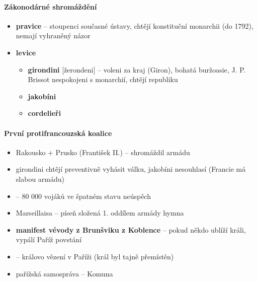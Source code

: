 \paragraph{Zákonodárné shromáždění}
\begin{itemize}
\item \textbf{pravice} -- stoupenci současné ústavy, chtějí konstituční monarchii (do 1792), nemají vyhraněný názor
\item \textbf{levice}
	\begin{itemize}
	\item \textbf{girondini} [žerondeni] -- voleni za kraj (Giron), bohatá buržoasie, J. P. Brissot \ra nespokojeni s monarchií, chtějí republiku
	\item \textbf{jakobíni}
	\item \textbf{cordelieři}
	\end{itemize}
\end{itemize}

\paragraph{První protifrancouzská koalice}
\begin{itemize}
\item Rakousko + Prusko (František II.) -- shromáždil armádu
\item girondini chtějí preventivně vyhásit válku, jakobíni nesouhlasí (Francie má slabou armádu)
\item {} -- 80 000 vojáků ve špatném
 stavu \ra neúspěch
\item Marseillaisa -- píseň složená 1. oddílem armády \ra hymna
\item \textbf{manifest vévody z Brunšviku z Koblence} -- pokud někdo ublíží králi, vypálí Paříž \ra povstání
\item {} -- královo vězení v Paříži (král byl tajně přemístěn)
\item pařížská samospráva -- Komuna
\end{itemize}


